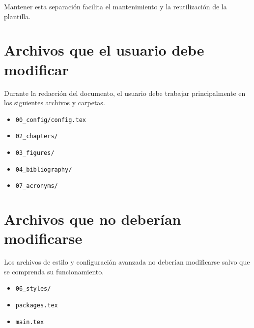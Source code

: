 


\begin{notebox}
Mantener esta separación facilita el mantenimiento
y la reutilización de la plantilla.
\end{notebox}




\section{Archivos que el usuario debe modificar}

Durante la redacción del documento, el usuario
debe trabajar principalmente en los siguientes
archivos y carpetas.

\begin{itemize}

\item \texttt{00\_config/config.tex}
\item \texttt{02\_chapters/}
\item \texttt{03\_figures/}
\item \texttt{04\_bibliography/}
\item \texttt{07\_acronyms/}

\end{itemize}




\section{Archivos que no deberían modificarse}

Los archivos de estilo y configuración avanzada
no deberían modificarse salvo que se comprenda
su funcionamiento.

\begin{itemize}

\item \texttt{06\_styles/}
\item \texttt{packages.tex}
\item \texttt{main.tex}

\end{itemize}



